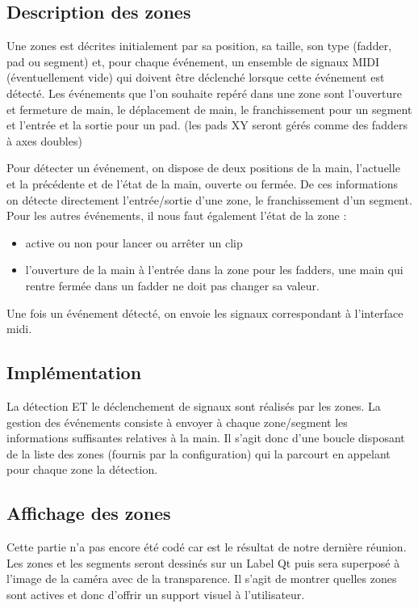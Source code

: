 \subsection{Description des zones}
\par Une zones est décrites initialement par sa position, sa taille, son type (fadder, pad ou segment) et, pour chaque événement, un ensemble de signaux MIDI (éventuellement vide) qui doivent être déclenché lorsque cette événement est détecté. Les événements que l'on souhaite repéré dans une zone sont l'ouverture et fermeture de main, le déplacement de main, le franchissement pour un segment et l'entrée et la sortie pour un pad. (les pads XY seront gérés comme des fadders à axes doubles)
\par Pour détecter un événement, on dispose de deux positions de la main, l'actuelle et la précédente et de l'état de la main, ouverte ou fermée. De ces informations on détecte directement l'entrée/sortie d'une zone, le franchissement d'un segment. Pour les autres événements, il nous faut également l'état de la zone :
\begin{itemize}
    \item active ou non pour lancer ou arrêter un clip
    \item l'ouverture de la main à l'entrée dans la zone pour les fadders, une main qui rentre fermée dans un fadder ne doit pas changer sa valeur.
\end{itemize}
\par Une fois un événement détecté, on envoie les signaux correspondant à l'interface midi.
\subsection{Implémentation}
\par La détection ET le déclenchement de signaux sont réalisés par les zones. La gestion des événements consiste à envoyer à chaque zone/segment les informations suffisantes relatives à la main. Il s'agit donc d'une boucle disposant de la liste des zones (fournis par la configuration) qui la parcourt en appelant pour chaque zone la détection.
\subsection{Affichage des zones}
\par Cette partie n'a pas encore été codé car est le résultat de notre dernière réunion. Les zones et les segments seront dessinés sur un Label Qt puis sera superposé à l'image de la caméra avec de la transparence. Il s'agit de montrer quelles zones sont actives et donc d'offrir un support visuel à l'utilisateur. 



